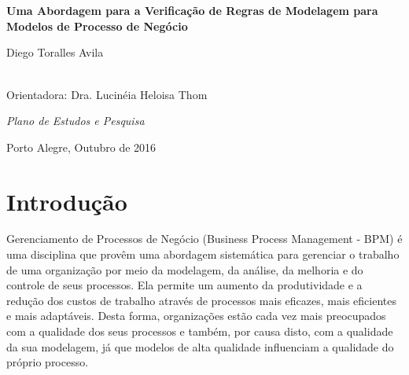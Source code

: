 \documentclass[12pt]{article}
\begin{document}
	
\begin{titlepage}
	\thispagestyle{empty}
	
	\vfill 
	
	
	\begin{center}
		
		\\
		
		
		 \\
		
		\vspace*{2.5cm}
		
		
		\Large{{\bf Uma Abordagem para a Verificação de Regras de Modelagem para Modelos de Processo de Negócio }}
		
		\vspace*{2cm}
		
		
		\Large{Diego Toralles Avila\\ }\\ 
		
		
		\vspace*{1cm}
		
		\normalsize{Orientadora: Dra. Lucinéia Heloisa Thom}
		
		\vspace*{1.5cm}
		\begin{flushright} 
			\parbox[l]{9.3cm}{
				
				\normalsize{\emph{Plano de Estudos e Pesquisa}}}
		\end{flushright}
		\vspace*{2cm}
		
		\large{Porto Alegre, Outubro de 2016}
	\end{center}
\end{titlepage}

\section{Introdução}

Gerenciamento de Processos de Negócio (Business Process Management - BPM) é uma disciplina que provêm uma abordagem sistemática para gerenciar o trabalho de uma organização por meio da modelagem, da análise, da melhoria e do controle de seus processos. Ela permite um aumento da produtividade e a redução dos custos de trabalho através de processos mais eficazes, mais eficientes e mais adaptáveis. Desta forma, organizações estão cada vez mais preocupados com a qualidade dos seus  processos e também, por causa disto, com a qualidade da sua modelagem,  já que modelos de alta qualidade influenciam a qualidade do próprio processo.
\end{document}
